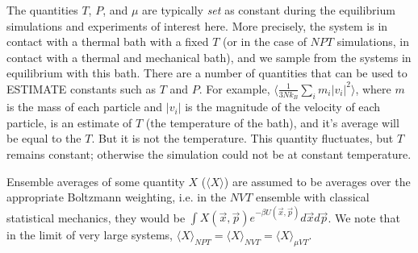 \documentclass[9pt,bestpractices]{livecoms}
\begin{document}
The quantities $T$, $P$, and $\mu$ are typically {\em set} as constant
during the equilibrium simulations and experiments of interest
here. More precisely, the system is in contact with a thermal bath
with a fixed $T$ (or in the case of $NPT$ simulations, in contact with
a thermal and mechanical bath), and we sample from the systems in
equilibrium with this bath.  There are a number of quantities that can
be used to ESTIMATE constants such as $T$ and $P$. For example,
$\langle \frac{1}{3Nk_B}\sum_i m_i |v_i|^2\rangle$, where $m$ is the
mass of each particle and $|v_i|$ is the magnitude of the velocity of
each particle, is an estimate of $T$ (the temperature of the bath), and
it's average will be equal to the $T$. But it is not the
temperature. This quantity fluctuates, but $T$ remains
constant; otherwise the simulation could not be at constant
temperature.



Ensemble averages of some quantity $X$ ($\langle X \rangle$) are
assumed to be averages over the appropriate Boltzmann weighting,
i.e. in the $NVT$ ensemble with classical statistical mechanics, they
would be $\int X(\vec{x},\vec{p}) e^{-\beta U(\vec{x},\vec{p})} d\vec{x}d\vec{p}$. We
note that in the limit of very large systems, ${\langle X \rangle}_{NPT}
= {\langle {X} \rangle}_{NVT} = {\langle {X} \rangle}_{\mu VT}$.
\end{document}
